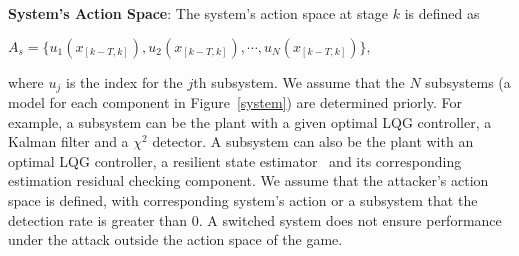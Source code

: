 

\iffalse by any given controller/estimator/detector combination of the system \fi

\textbf{System's Action Space}: The system's action space at stage $k$ is defined as
\\\centerline{$
A_{s}=\{u_{1}(x_{[k-T,k]}), u_{2}(x_{[k-T,k]}),\cdots, u_{N}(x_{[k-T,k]})\},
$}  %
where $u_{j}$ is the index for the $j$th subsystem. We assume that the $N$ subsystems (a model for each component in Figure~\ref{system}) are determined priorly. For example, a subsystem can be the plant with a given optimal LQG controller, a Kalman filter and a $\chi^2$ detector. A subsystem can also be the plant with an optimal LQG controller, a resilient state estimator~\cite{res_estimator} and its corresponding estimation residual checking component. We assume that the attacker's action space is defined, with corresponding system's action or a subsystem that the detection rate is greater than $0$. A switched system does not ensure performance under the attack outside the action space of the game.

